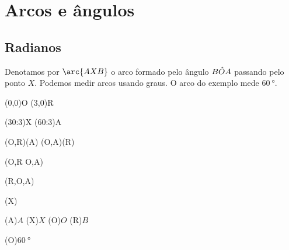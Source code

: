 \chapter{Arcos e ângulos}

\section{Radianos}

\begin{multi}

	\noindent Denotamos por $\arc{AXB}$ o arco formado pelo ângulo $B\Hat{O}A$ passando pelo ponto $X$. Podemos medir arcos usando graus. O arco do exemplo mede $\SI{60}{\degree}$.

	\nextcol

	\begin{tikzscale}[0.8]
		\tkzDefPoint(0,0){O}
		\tkzDefPoint(3,0){R}
		\begin{scope}[shift={(O)}]
			\tkzDefPoint(30:3){X}
			\tkzDefPoint(60:3){A}
		\end{scope}

		\tkzDrawArc[color=red, thick](O,R)(A)
		\tkzDrawArc[color=black](O,A)(R)

		\tkzDrawSegments(O,R O,A)

		\tkzMarkAngle[size=1](R,O,A)

		\tkzDrawPoints[fill=red!50, color=red!80!black](X)

		\tkzLabelPoint[yshift=10pt](A){$A$}
		\tkzLabelPoint[yshift=10pt](X){$X$}
		\tkzLabelPoint[xshift=-17pt, yshift=5pt](O){$O$}
		\tkzLabelPoint[yshift=5pt, xshift=0pt](R){$B$}

		\tkzLabelPoint[xshift=19pt, yshift=21pt](O){$\SI{60}{\degree}$}

	\end{tikzscale}
\end{multi}


